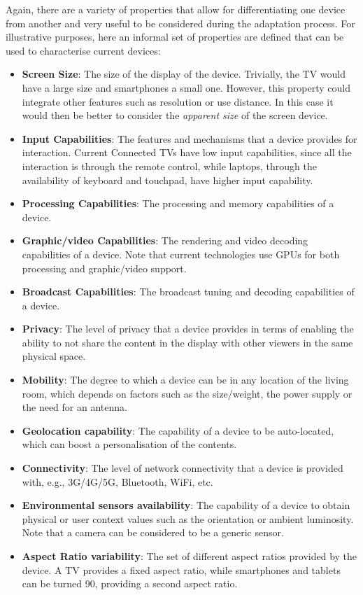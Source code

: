 Again, there are a variety of properties that allow for differentiating one device from another and very useful to be considered during the adaptation process. 
For illustrative purposes, here an informal set of properties are defined that can be used to characterise current devices: 


\begin{itemize}
	\item \textbf{Screen Size}: The size of the display of the device. Trivially, the TV would have a large size and smartphones a small one. However, this property could integrate other features such as resolution or use distance. In this case it would then be better to consider the \emph{apparent size} of the screen device. 
	\item \textbf{Input Capabilities}: The features and mechanisms that a device provides for interaction. Current Connected TVs have low input capabilities, since all the interaction is through the remote control, while laptops, through the availability of keyboard and touchpad, have higher input capability.
	\item \textbf{Processing Capabilities}: The processing and memory capabilities of a device.
	\item \textbf{Graphic/video Capabilities}: The rendering and video decoding capabilities of a device. Note that current technologies use GPUs for both processing and graphic/video support.
	\item \textbf{Broadcast Capabilities}: The broadcast tuning and decoding capabilities of a device.
	\item \textbf{Privacy}: The level of privacy that a device provides in terms of enabling the ability to not share the content in the display with other viewers in the same physical space.
	\item \textbf{Mobility}: The degree to which a device can be in any location of the living room, which depends on factors such as the size/weight, the power supply or the need for an antenna. 
	\item \textbf{Geolocation capability}: The capability of a device to be auto-located, which can boost a personalisation of the contents.
	\item \textbf{Connectivity}: The level of network connectivity that a device is provided with, e.g., 3G/4G/5G, Bluetooth, WiFi, etc.
	\item \textbf{Environmental sensors availability}: The capability of a device to obtain physical or user context values such as the orientation or ambient luminosity. Note that a camera can be considered to be a generic sensor.
	\item \textbf{Aspect Ratio variability}: The set of different aspect ratios provided by the device. A TV provides a fixed aspect ratio, while smartphones and tablets can be turned 90\textdegree, providing a second aspect ratio.
\end{itemize}

